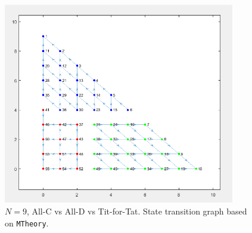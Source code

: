 \documentclass[12pt]{report}
\begin{document}
\begin{figure}
    \centering
    \includegraphics[width=0.9\textwidth]{CDTFTgraph.png}
    \caption{$N=9$, All-C vs All-D vs Tit-for-Tat. State transition graph based on \texttt{MTheory}.}
    \label{CDTFTgraph}
\end{figure}
\end{document}
